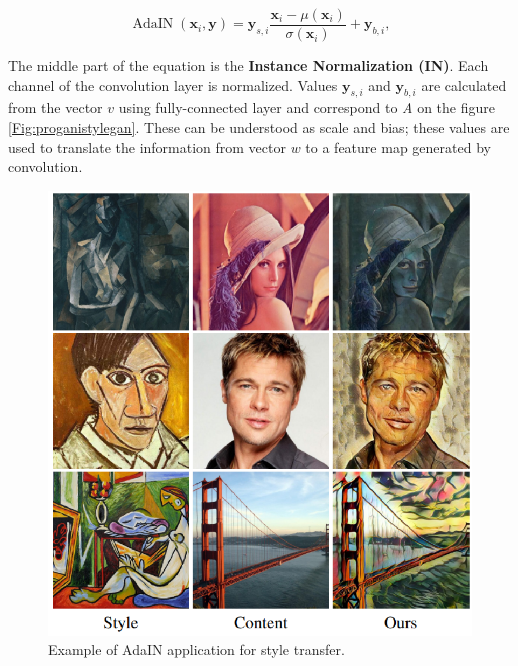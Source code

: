 \documentclass[11pt,a4paper,openany]{book}
\begin{document}
\begin{equation}
\operatorname{AdaIN}\left(\mathbf{x}_{i}, \mathbf{y}\right)=\mathbf{y}_{s, i} \frac{\mathbf{x}_{i}-\mu\left(\mathbf{x}_{i}\right)}{\sigma\left(\mathbf{x}_{i}\right)}+\mathbf{y}_{b, i},
\end{equation}


\noindent The middle part of the equation is the \textbf{Instance Normalization (IN)}. Each channel of the convolution layer is normalized. Values $\textbf{y}_{s,i}$ and $\textbf{y}_{b,i}$ are calculated from the vector $v$ using fully-connected layer and correspond to \textit{A} on the figure \ref{Fig:proganistylegan}. These can be understood as scale and bias; these values are used to translate the information from vector $w$ to a feature map generated by convolution.

\begin{figure}[ht!]
    \centering
    \includegraphics[scale=1.0]{figs/adaptive-instance-norm.eps}
    \caption{Example of AdaIN application for style transfer. \cite{adain}}\label{Fig:STYLEGAN}
\end{figure}
\end{document}
